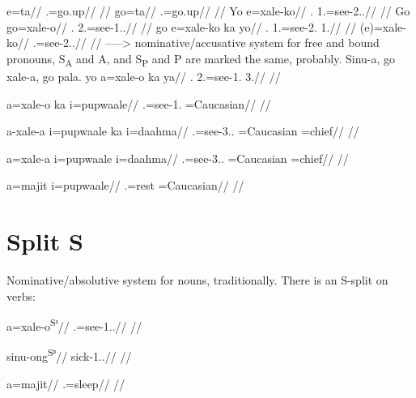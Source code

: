 \pex
\a
\begingl
\gla e=ta//
.=go.up//
\glft {}//
\endgl
\a
\begingl
\gla go=ta//
.=go.up//
\glft {}//
\endgl
\a
\begingl
\gla Yo e=xale-ko//
. 1.=see-2..//
\glft {}//
\endgl
\a
\begingl
\gla Go go=xale-o//
. 2.=see-1..//
\glft {}//
\endgl
\a
\begingl
\gla go e=xale-ko ka yo//
. 1.=see-2.  1.//
\glft {}//
\endgl
\a
\begingl
\gla (e)=xale-ko//
.=see-2..//
\glft {}//
\endgl
\xe 
-----> nominative/accusative system for free and bound pronouns, S\textsubscript{A} and A, and S\textsubscript{P} and P are marked the same, probably. Sinu-a, go xale-a, go pala.
\pex
\a
\begingl
\gla yo a=xale-o ka ya//
. 2.=see-1.  3.//
\glft {}//
\endgl 

\a
\begingl
\gla a=xale-o ka i=pupwaale//
.=see-1.  =Caucasian//
\glft {}//
\endgl


\a
\begingl
\gla a-xale-a i=pupwaale ka i=daahma//
.=see-3.. =Caucasian  =chief//
\glft {}//
\endgl

\a
\begingl
\gla *a=xale-a i=pupwaale i=daahma//
.=see-3.. =Caucasian =chief//
\glft {}//
\endgl

\a
\begingl
\gla a=majit i=pupwaale//
.=rest =Caucasian//
\glft {}//
\endgl
\xe 


\section{Split S}
Nominative\slash absolutive system for nouns, traditionally. There is an S-split on verbs:

\pex 
\a 
\begingl 
\gla a=xale-o\textsuperscript{Sᵃ}//
.=see-1..//
\glft {}//
\endgl 

\a 
\begingl 
\gla sinu-ong\textsuperscript{Sᵖ}//
\glb sick-1..//
\glft {}//
\endgl 

\a 
\begingl 
\gla a=majit//
.=sleep//
\glft {}//
\endgl

